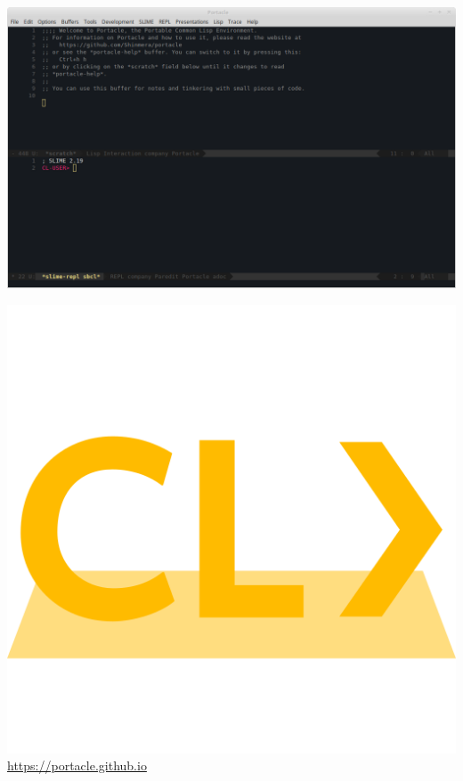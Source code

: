 \documentclass[14pt]{beamer}
\begin{document}
\begin{frame}
  \begin{center}
    \includegraphics[width=1.0\columnwidth]{portacle-start.png}
  \end{center}
\end{frame}

\begin{frame}
  \begin{center}
    \includegraphics[width=0.5\columnwidth]{portacle.png}
    \url{https://portacle.github.io}
  \end{center}
\end{frame}
\end{document}

